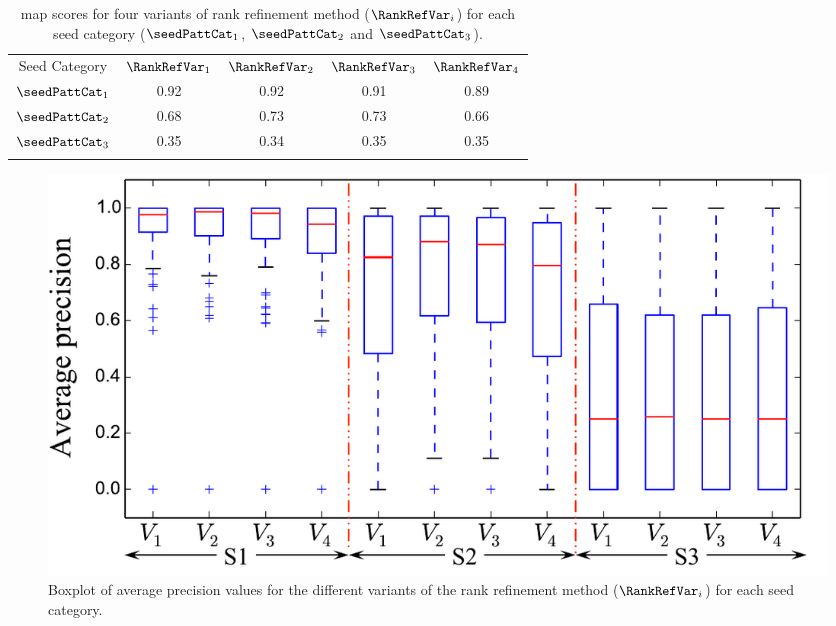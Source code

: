 \begin{table} 
	\begin{centering}	
		\begin{tabular}{ c | c c c c}
			\tabletop
			Seed Category   & $\RankRefVar_1$		&	$\RankRefVar_2$ & $\RankRefVar_3$	 &	$\RankRefVar_4$ 	\\	
			\tablemid
			$\seedPattCat_1$ & 0.92    &	0.92		&	0.91    &	0.89\\
			$\seedPattCat_2$ & 0.68    &	0.73		&	0.73    &	0.66\\
			$\seedPattCat_3$ & 0.35    &	0.34    &	0.35    &	0.35\\
			\tablebot
		\end{tabular}
		\caption[\acrshort{map} scores for four variants of rank refinement method for each seed pattern category]{\acrshort{map} scores for four variants of rank refinement method ($\RankRefVar_i$) for each seed category ($\seedPattCat_1$, $\seedPattCat_2$ and $\seedPattCat_3$).}
		\label{tab:meanAveragePrecision_pattern_discovery}
		\par \end{centering}	
\end{table}

\begin{figure}
	\begin{center}
		\includegraphics[width=\figSizeEightyFive]{ch06_patterns/figures/discovery/boxPlot.pdf}
	\end{center}
	\caption[Boxplot of average precision values for the different variants of the rank refinement method]{Boxplot of average precision values for the different variants of the rank refinement method ($\RankRefVar_i$) for each seed category.}
	\label{fig:boxPlotMAPPatternDiscovery}
\end{figure}

